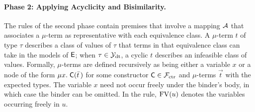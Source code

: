 \paragraph{Phase 2: Applying Acyclicity and Bisimilarity.}
The rules of the second phase contain premises that involve a mapping $\mathcal{A}$
that associates a $\mu$-term as representative with each equivalence class.
A $\mu$-term $t$ of type $\tau$ describes a class of values of
$\tau$ that terms in that equivalence class can take in the models of $\mathsf{E}$;
when $\tau \in \mathcal{Y}_{\mathrm{dt}}$, a cyclic $t$ describes an infeasible class of values.
Formally, $\mu$-terms are defined recursively as being either a variable $x$
or a node of the form
$\mu x.\; \textsf{C}( \bar t\, )$ for some constructor $\textsf{C} \in \mathcal{F}_{\mathrm{ctr}}$ and
$\mu$-terms $\vec t$ with the expected types.
The variable $x$ need not occur freely under the binder's body, in which case the
binder can be omitted.
In the  rule,
$\mathrm{FV}( u )$ denotes the variables occurring freely in $u$.

%


